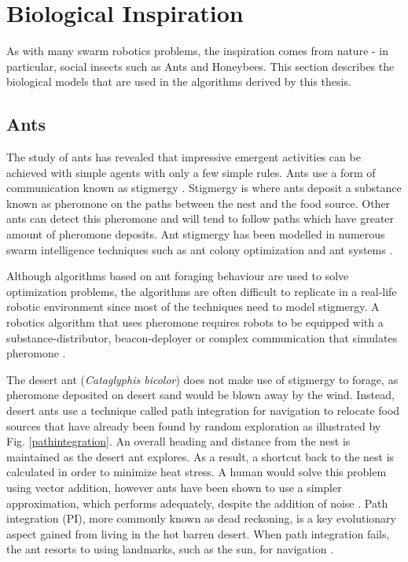 \section{Biological Inspiration}

As with many swarm robotics problems, the inspiration comes from nature - in particular, social insects such as Ants and Honeybees. This section describes the biological models that are used in the algorithms derived by this thesis. 

\label{sec:second:biological}

\subsection{Ants}
The study of ants has revealed that impressive emergent activities can be achieved with  simple agents with only a few simple rules. Ants use a form of communication known as stigmergy \cite{dorigo2000ant}. Stigmergy is where ants deposit a substance known as pheromone on the paths between the nest and the food source. Other ants can detect this pheromone and will tend to follow paths which have greater amount of pheromone deposits. Ant stigmergy has been modelled in numerous swarm intelligence techniques such as ant colony optimization and ant systems \cite{dorigo2006ant, dorigo2010ant}. 
 
Although algorithms based on ant foraging behaviour are used to solve optimization problems, the algorithms are often difficult to replicate in a real-life robotic environment since most of the techniques need to model stigmergy. A robotics algorithm that uses pheromone requires robots to be equipped with a substance-distributor, beacon-deployer or complex communication that simulates pheromone \cite{hoff2010two}.


The desert ant (\textit{Cataglyphis bicolor}) does not make use of stigmergy to forage, as pheromone deposited on desert sand would be blown away by the wind. Instead, desert ants use a technique called path integration for navigation to relocate food sources that have already been found by random exploration \cite{collett1998local,wehner2003desert} as illustrated by Fig. \ref{pathintegration}. An overall heading and distance from the nest is maintained as the desert ant explores. As a result, a shortcut back to the nest is calculated in order to minimize heat stress. A human would solve this problem using vector addition, however ants have been shown to use a simpler approximation, which performs adequately, despite the addition of noise \cite{muller1988path}. Path integration (PI), more commonly known as dead reckoning, is a key evolutionary aspect gained from living in the hot barren desert. When path integration fails, the ant resorts to using landmarks, such as the sun, for navigation \cite{collett1998local}. 

